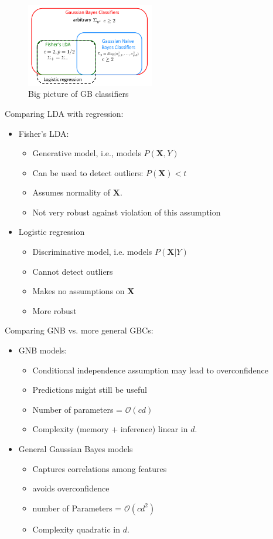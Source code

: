 \documentclass[a4paper,10pt,twoside]{article}
\begin{document}
\begin{figure}
  \centering
  \includegraphics[width=0.5\textwidth]{figures/gbclass.png}
  \caption{Big picture of GB classifiers}
  \label{fig:gbclass}
\end{figure}

Comparing LDA with regression:
\begin{itemize}
\item Fisher's LDA:
  \begin{itemize}
  \item Generative model, i.e., models $P(\mathbf{X},Y)$
  \item Can be used to detect outliers: $P(\mathbf{X})<t$
  \item Assumes normality of $\mathbf{X}$.
  \item Not very robust against violation of this assumption
  \end{itemize}
\item Logistic regression
  \begin{itemize}
  \item Discriminative model, i.e. models $P(\mathbf{X}|Y)$
  \item Cannot detect outliers
  \item Makes no assumptions on $\mathbf{X}$
  \item More robust
  \end{itemize}
\end{itemize}

Comparing GNB vs. more general GBCs:
\begin{itemize}
\item GNB models:
  \begin{itemize}
  \item Conditional independence assumption may lead to overconfidence
  \item Predictions might still be useful
  \item Number of parameters = $\mathcal{O}(cd)$
  \item Complexity (memory + inference) linear in $d$.
  \end{itemize}
\item General Gaussian Bayes models
  \begin{itemize}
  \item Captures correlations among features
  \item avoids overconfidence
  \item number of Parameters = $\mathcal{O}(cd^2)$
    \item Complexity quadratic in $d$.
  \end{itemize}
\end{itemize}
\end{document}
